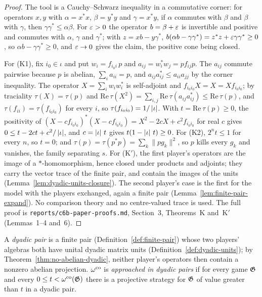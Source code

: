 \begin{proof}
\leanok
The tool is a Cauchy--Schwarz inequality in a commutative corner: for operators $x, y$ with $\alpha =
x^* x$, $\beta = y^* y$ and $\gamma = x^* y$, if $\alpha$ commutes with $\beta$ and $\beta$ with
$\gamma$, then $\gamma \gamma^* \leq \alpha \beta$. For $\varepsilon > 0$ the operator $b = \beta + \varepsilon$ is
invertible and positive and commutes with $\alpha$, $\gamma$ and $\gamma^*$; with $z = x b - y
\gamma^*$, $b (\alpha b - \gamma \gamma^*) = z^* z + \varepsilon \gamma \gamma^* \geq 0$, so $\alpha b -
\gamma \gamma^* \geq 0$, and $\varepsilon \to 0$ gives the claim, the positive cone being closed.

For (K1), fix $i_0 \in \iota$ and put $w_i = f_{i_0 i}\, p$ and $a_{ij} = w_i^* w_j = p f_{ij} p$. The
$a_{ij}$ commute pairwise because $p$ is abelian, $\sum_i a_{ii} = p$, and $a_{ij} a_{ij}^* \leq
a_{ii} a_{jj}$ by the corner inequality. The operator $X = \sum_i w_i w_i^*$ is self-adjoint and
$f_{i_0 i_0} X = X = X f_{i_0 i_0}$; by traciality $\tau(X) = \tau(p)$ and $\mathrm{Re}\, \tau(X^2) =
\sum_{i, j} \mathrm{Re}\, \tau(a_{ij} a_{ij}^*) \leq \mathrm{Re}\, \tau(p)$, and $\tau(f_{ii}) =
\tau(f_{i_0 i_0})$ for every $i$, so $\tau(f_{i_0 i_0}) = 1/\left\vert {\iota} \right\vert$. With $t = \mathrm{Re}\,
\tau(p) \geq 0$, the positivity of $(X - c f_{i_0 i_0})^* (X - c f_{i_0 i_0}) = X^2 - 2cX + c^2
f_{i_0 i_0}$ for real $c$ gives $0 \leq t - 2ct + c^2/\left\vert {\iota} \right\vert$, and $c = \left\vert {\iota} \right\vert\, t$ gives
$t (1 - \left\vert {\iota} \right\vert\, t) \geq 0$. For (K2), $2^n t \leq 1$ for every $n$, so $t = 0$; and $\tau(p) =
\tau(p^* p) = \sum_k \|p g_k\|^2$, so $p$ kills every $g_k$ and vanishes, the family separating $s$.
For (K$'$), the first player's operators are the image of a $*$-homomorphism, hence closed under
products and adjoints; they carry the vector trace of the finite pair, and contain the images of the
units (Lemma~\ref{lem:dyadic-units-closure}). The second player's case is the first for the model
with the players exchanged, again a finite pair (Lemma~\ref{lem:finite-pair-expand}). No comparison
theory and no centre-valued trace is used. The full proof is \texttt{reports/c6b-paper-proofs.md},
Section~3, Theorems~K and~K$'$ (Lemmas~1--4 and~6).
\end{proof}

\begin{definition}
\label{def:dyadic-pair}
\leanok
A \emph{dyadic pair} is a finite pair (Definition~\ref{def:finite-pair}) whose two players' algebras
both have unital dyadic matrix units (Definition~\ref{def:dyadic-units}); by
Theorem~\ref{thm:no-abelian-dyadic}, neither player's operators then contain a nonzero abelian
projection. $\omega^{\mathrm{co}}$ is \emph{approached in dyadic pairs} if for every game $\mathfrak{G}$ and every $0
\leq t < \omega^{\mathrm{co}}(\mathfrak{G})$ there is a projective strategy for $\mathfrak{G}$ of value greater than $t$ in a
dyadic pair.
\end{definition}

